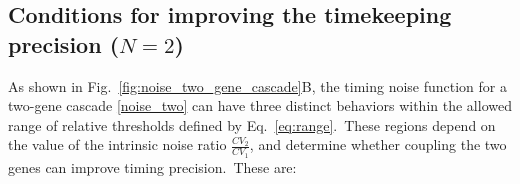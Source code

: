 \documentclass[aps,prb,reprint,superscriptaddress]{revtex4-2}
\begin{document}
\subsection*{Conditions for improving the timekeeping precision (\texorpdfstring{$N=2$}{N=2})}


As shown in Fig.~\ref{fig:noise_two_gene_cascade}B, the timing noise function for a two-gene cascade \eqref{noise_two} can have three distinct behaviors within the allowed range of relative thresholds defined by Eq.~\eqref{eq:range}.~These regions depend on the value of the intrinsic noise ratio $\frac{CV_{2}}{CV_{1}}$, and determine whether coupling the two genes can improve timing precision.~These are:
\end{document}
